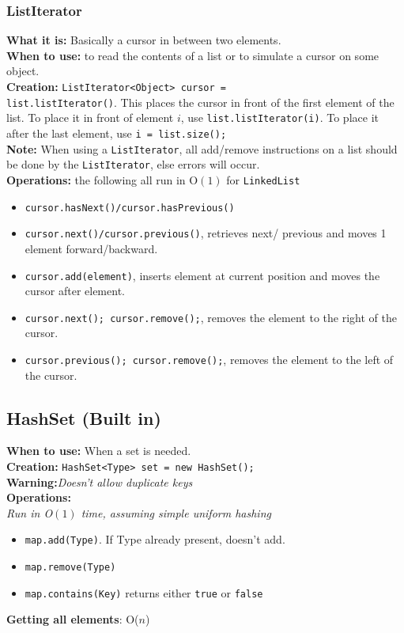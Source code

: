 \documentclass[a4paper,10pt]{article}
\begin{document}
\begin{multicols}{2}
\subsubsection{ListIterator}
\textbf{What it is:} Basically a cursor in between two elements.\\
\textbf{When to use:} to read the contents of a list or to simulate a cursor on some object.\\
\textbf{Creation:} \lstinline|ListIterator<Object> cursor = |\\\lstinline|list.listIterator()|. This places the cursor in front of the first element of the list. To place it in front of element $i$, use \lstinline|list.listIterator(i)|. To place it after the last element, use \lstinline|i = list.size();|\\
\textbf{Note:} When using a \lstinline|ListIterator|, all add/remove instructions on a list should be done by the \lstinline|ListIterator|, else errors will occur.\\
\textbf{Operations:} the following all run in O$(1)$ for \lstinline|LinkedList|
\begin{itemize}[nolistsep,noitemsep]
\itemsep0em
\item \lstinline|cursor.hasNext()/cursor.hasPrevious()|
\item \lstinline|cursor.next()/cursor.previous()|, retrieves next/ previous and moves 1 element forward/backward.
\item \lstinline|cursor.add(element)|, inserts element at current position and moves the cursor after element.
\item \lstinline|cursor.next(); cursor.remove();|, removes the element to the right of the cursor.
\item \lstinline|cursor.previous(); cursor.remove();|, removes the element to the left of the cursor.
\end{itemize}
\subsection{HashSet (Built in)} 
\textbf{When to use:} When a set is needed.\\
\textbf{Creation:} \lstinline|HashSet<Type> set = new HashSet();|\\
\textbf{Warning:}\textit{Doesn't allow duplicate keys}\\
\textbf{Operations:}\\
\textit{Run in O$(1)$ time, assuming simple uniform hashing}
\begin{itemize}[nolistsep,noitemsep]
\itemsep0em
\item \lstinline|map.add(Type)|. If Type already present, doesn't add.
\item \lstinline|map.remove(Type)|
\item \lstinline|map.contains(Key)| returns either \lstinline|true| or \lstinline|false|
\end{itemize}
\textbf{Getting all elements}: O($n$)


\end{multicols}
\end{document}
